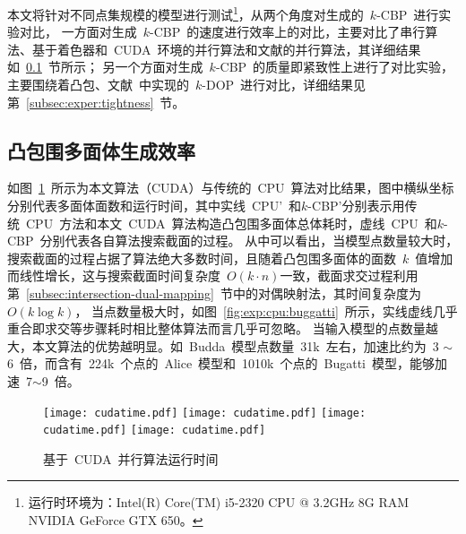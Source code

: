 本文将针对不同点集规模的模型进行测试\footnote{运行时环境为：Intel(R) Core(TM)
i5-2320 CPU @ 3.2GHz 8G RAM NVIDIA GeForce GTX
650。}，从两个角度对生成的~$k$-CBP~进行实验对比，
一方面对生成~$k$-CBP~的速度进行效率上的对比，主要对比了串行算法、基于着色器和~CUDA~环境的并行算法和文献的并行算法，其详细结果如~\ref{subsec:exper:efficiency}~节所示；
另一个方面对生成~$k$-CBP~的质量即紧致性上进行了对比实验，主要围绕着凸包、文献~中实现的~$k$-DOP~进行对比，详细结果见第~\ref{subsec:exper:tightness}~节。

\subsection{凸包围多面体生成效率}
\label{subsec:exper:efficiency}

如图~\ref{fig:chart:exps:cputime}~所示为本文算法（CUDA）与传统的~CPU~算法对比结果，图中横纵坐标分别代表多面体面数和运行时间，其中实线~CPU\rm{'}~和$k$-CBP{'}分别表示用传统~CPU~方法和本文~CUDA~算法构造凸包围多面体总体耗时，虚线~CPU~和$k$-CBP~分别代表各自算法搜索截面的过程。
从中可以看出，当模型点数量较大时，搜索截面的过程占据了算法绝大多数时间，且随着凸包围多面体的面数~$k$~值增加而线性增长，这与搜索截面时间复杂度~$O(k\cdot
n)$一致，截面求交过程利用第~\ref{subsec:intersection-dual-mapping}~节中的对偶映射法，其时间复杂度为~$O(k\log k)$，
当点数量极大时，如图~\ref{fig:exp:cpu:buggatti}~所示，实线虚线几乎重合即求交等步骤耗时相比整体算法而言几乎可忽略。
当输入模型的点数量越大，本文算法的优势越明显。如~Budda~模型点数量~31k~左右，加速比约为~3 $\sim$ 6~倍，而含有~224k~个点的~Alice~模型和~1010k~个点的~Bugatti~模型，能够加速~7$\sim$9~倍。

\begin{figure}[htbp] %
\centering
{}
{  
   \texttt{[image: cudatime.pdf]}
}
{  
    \texttt{[image: cudatime.pdf]}
}\linebreak %
{  
   \texttt{[image: cudatime.pdf]}
}
{  
   \texttt{[image: cudatime.pdf]}
}
\caption{基于~CUDA~并行算法运行时间}
\label{fig:chart:exps:cputime}
\end{figure}

